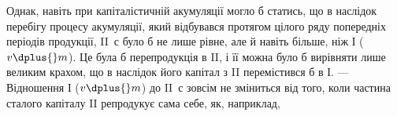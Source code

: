 Однак, навіть при капіталістичній акумуляції могло б статись, що в
наслідок перебігу процесу акумуляції, який відбувався протягом цілого
ряду попередніх періодів продукції, II~$с$ було б не лише рівне, але й навіть
більше, ніж І ($v \dplus{} m$). Це була б перепродукція в II, і її можна було б
вирівняти лише великим крахом, що в наслідок його капітал з II перемістився
б в І. — Відношення І ($v \dplus{} m$) до II~$с$ зовсім не зміниться від того,
коли частина сталого капіталу II репродукує сама себе, як, наприклад,
\parbreak{}  %
